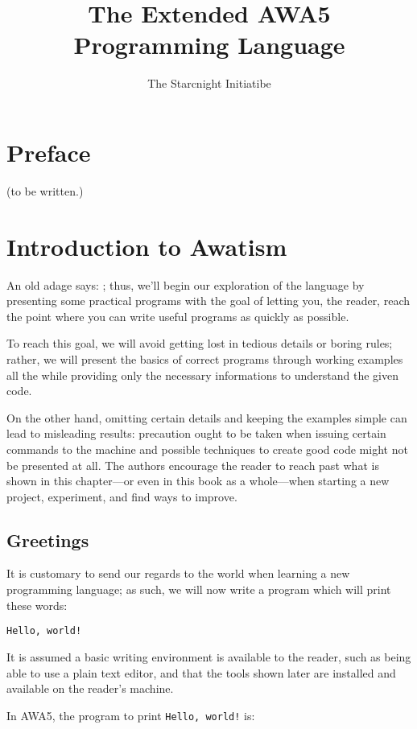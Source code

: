 \documentclass[12pt,a4paper,draft]{book}
\author{The Starcnight Initiatibe}
\title{The Extended AWA5 Programming Language}
\begin{document}
\frontmatter
\tableofcontents

\chapter{Preface}
(to be written.)

\mainmatter
\chapter{Introduction to Awatism}
An old adage says:
;
thus, we'll begin our exploration of the language by presenting some
practical programs with the goal of letting you, the reader, reach the
point where you can write useful programs as quickly as possible.

To reach this goal, we will avoid getting lost in tedious details or
boring rules; rather, we will present the basics of correct programs
through working examples all the while providing only the necessary
informations to understand the given code.

On the other hand, omitting certain details and keeping the examples
simple can lead to misleading results: precaution ought to be taken
when issuing certain commands to the machine and possible techniques
to create good code might not be presented at all. The authors
encourage the reader to reach past what is shown in this chapter---or
even in this book as a whole---when starting a new project,
experiment, and find ways to improve.

\section{Greetings}
It is customary to send our regards to the world when learning a new
programming language; as such, we will now write a program which will
print these words:
\begin{verbatim}
Hello, world!
\end{verbatim}

It is assumed a basic writing environment is available to the reader,
such as being able to use a plain text editor, and that the tools
shown later are installed and available on the reader's machine.

In AWA5, the program to print \verb|Hello, world!| is:

\end{document}

